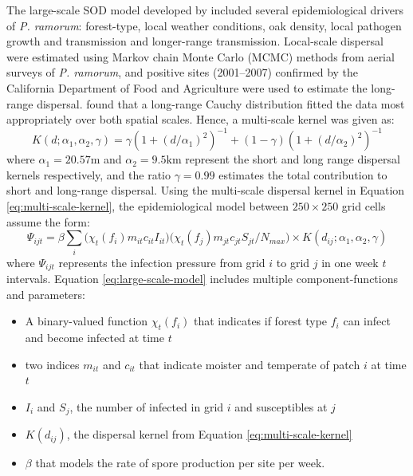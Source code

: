 The large-scale SOD model developed by \cite{meentemeyer2011epidemiological} included several epidemiological 
drivers of \textit{P. ramorum}: forest-type, local weather conditions, oak density, local pathogen growth and transmission
and longer-range transmission. Local-scale dispersal were estimated
using Markov chain Monte Carlo (MCMC) methods from aerial surveys \cite{valachovic2008wildland} 
of \textit{P. ramorum}, and positive sites (2001–2007) confirmed by the California Department of
Food and Agriculture were used to estimate the long-range dispersal. \cite{meentemeyer2004mapping}
found that a long-range Cauchy distribution fitted the data most appropriately over both spatial scales.
Hence, a multi-scale kernel was given as:
\begin{equation}
\label{eq:multi-scale-kernel}
    K(d; \alpha_1, \alpha_2, \gamma) = \gamma( 1 + (d/\alpha_1)^2 )^{-1} + (1 - \gamma)( 1 + (d/\alpha_2)^2 )^{-1}
\end{equation}
where $\alpha_1 = 20.57\mathrm{m}$ and $\alpha_2 = 9.5\mathrm{km}$ represent the short and long range dispersal
kernels respectively, and the ratio $\gamma=0.99$ estimates the total contribution to short and
long-range dispersal. Using the multi-scale dispersal kernel in Equation \ref{eq:multi-scale-kernel},
the epidemiological model between $\mathrm{250 \times 250}$ grid cells assume the form:
\begin{equation}
\label{eq:large-scale-model}
    \Psi_{ijt} = \beta \sum_i \big(\chi_t (f_i) m_{it} c_{it} I_{it} \big) \big( \chi_t(f_j) m_{jt} c_{jt} S_{jt} /N_{max} \big) \times K(d_{ij}; \alpha_1, \alpha_2, \gamma)
\end{equation}
where $\Psi_{ijt}$ represents the infection pressure from grid $i$ to grid $j$ in one week $t$ intervals. 
Equation \ref{eq:large-scale-model} includes multiple component-functions and parameters: 
\begin{itemize}
    \item A binary-valued function $\chi_t(f_i)$ that indicates if forest type $f_i$ can infect and become infected at time $t$
    \item two indices $m_{it}$ and $c_{it}$ that indicate moister and temperate of patch $i$ at time $t$
    \item $I_i$ and $S_j$, the number of infected in grid $i$ and susceptibles at $j$
    \item $K(d_{ij})$, the dispersal kernel from Equation \ref{eq:multi-scale-kernel}
    \item $\beta$ that models the rate of spore production per site per week.
\end{itemize}

